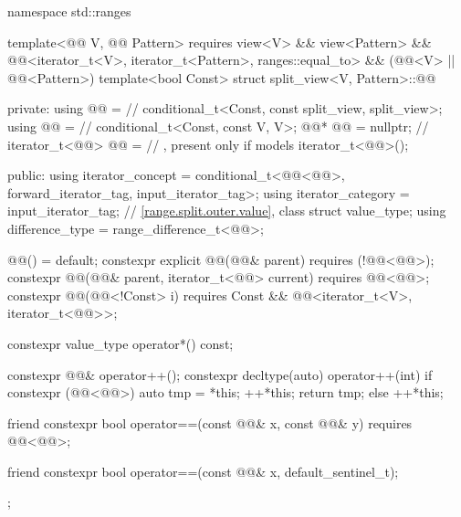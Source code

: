 %
\begin{codeblock}
namespace std::ranges {
  template<@@ V, @@ Pattern>
    requires view<V> && view<Pattern> &&
             @@<iterator_t<V>, iterator_t<Pattern>, ranges::equal_to> &&
             (@@<V> || @@<Pattern>)
  template<bool Const>
  struct split_view<V, Pattern>::@@ {
  private:
    using @@ =                          // \expos
      conditional_t<Const, const split_view, split_view>;
    using @@   =                          // \expos
      conditional_t<Const, const V, V>;
    @@* @@ = nullptr;              // \expos
    iterator_t<@@> @@ =             // \expos, present only if  models 
      iterator_t<@@>();

  public:
    using iterator_concept  =
      conditional_t<@@<@@>, forward_iterator_tag, input_iterator_tag>;
    using iterator_category = input_iterator_tag;
    // \ref{range.split.outer.value}, class 
    struct value_type;
    using difference_type   = range_difference_t<@@>;

    @@() = default;
    constexpr explicit @@(@@& parent)
      requires (!@@<@@>);
    constexpr @@(@@& parent, iterator_t<@@> current)
      requires @@<@@>;
    constexpr @@(@@<!Const> i)
      requires Const && @@<iterator_t<V>, iterator_t<@@>>;

    constexpr value_type operator*() const;

    constexpr @@& operator++();
    constexpr decltype(auto) operator++(int) {
      if constexpr (@@<@@>) {
        auto tmp = *this;
        ++*this;
        return tmp;
      } else
        ++*this;
    }

    friend constexpr bool operator==(const @@& x, const @@& y)
      requires @@<@@>;

    friend constexpr bool operator==(const @@& x, default_sentinel_t);
  };
}
\end{codeblock}

